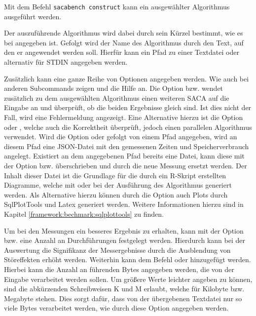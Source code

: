 {Mit dem Befehl \texttt{sacabench construct} kann ein ausgewählter Algorithmus ausgeführt werden. 
\par
Der auszuführende Algorithmus wird dabei durch sein Kürzel bestimmt, wie es bei  angegeben ist. 
Gefolgt wird der Name des Algorithmus durch den Text, auf den er angewendet werden soll. 
Hierfür kann ein Pfad zu einer Textdatei oder alternativ \termfont{-} für STDIN angegeben werden. 
\par
Zusätzlich kann eine ganze Reihe von Optionen angegeben werden. 
Wie auch bei anderen Subcommands zeigen  und  die Hilfe an. 
Die Option  bzw.  wendet zusätzlich zu dem ausgewählten Algorithmus einen weiteren SACA auf die Eingabe an und überprüft, ob die beiden Ergebnisse gleich sind. 
Ist dies nicht der Fall, wird eine Fehlermeldung angezeigt. 
Eine Alternative hierzu ist die Option  oder , welche auch die Korrektheit überprüft, jedoch einen parallelen Algorithmus verwendet. 
Wird die Option  oder  gefolgt von einem Pfad angegeben, wird an diesem Pfad eine JSON-Datei mit den gemessenen Zeiten und Speicherverbrauch angelegt. 
Existiert an dem angegebenen Pfad bereits eine Datei, kann diese mit der Option  bzw.  überschrieben und durch die neue Messung ersetzt werden. 
Der Inhalt dieser Datei ist die Grundlage für die durch ein R-Skript erstellten Diagramme, welche mit  oder  bei der Ausführung des Algorithmus generiert werden. 
Als Alternative hierzu können durch die Option  auch Plots durch SqlPlotTools und Latex generiert werden.
Weitere Informationen hierzu sind in Kapitel \ref{framework:bechmark:sqlplottools} zu finden.\par
Um bei den Messungen ein besseres Ergebnis zu erhalten, kann mit der Option  bzw.  eine Anzahl an Durchführungen festgelegt werden. 
Hierdurch kann bei der Auswertung die Signifikanz der Messergebnisse durch die Ausblendung von Störeffekten erhöht werden.
Weiterhin kann dem Befehl  oder  hinzugefügt werden. 
Hierbei kann die Anzahl an führenden Bytes angegeben werden, die von der Eingabe verarbeitet werden sollen.
Um größere Werte leichter angeben zu können, sind die abkürzenden Schreibweisen K und M erlaubt, welche für Kilobyte bzw. Megabyte stehen.
Dies sorgt dafür, dass von der übergebenen Textdatei nur so viele Bytes verarbeitet werden, wie durch diese Option angegeben werden.\par
}
